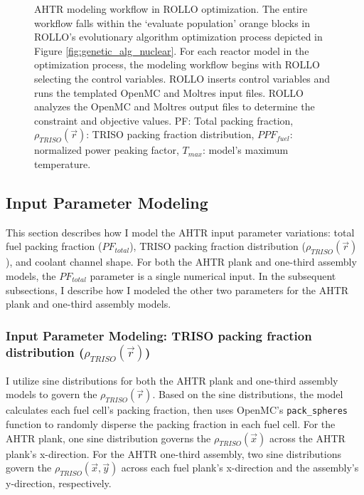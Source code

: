 \begin{figure}[htbp]
    \caption{\acrfull{AHTR} modeling workflow in \acrfull{ROLLO} optimization. The entire 
    workflow falls within the `evaluate population' orange blocks in ROLLO's evolutionary 
    algorithm optimization process depicted in Figure \ref{fig:genetic_alg_nuclear}. 
    For each reactor model in the optimization process, the modeling workflow begins 
    with ROLLO selecting the control variables. 
    ROLLO inserts control variables and runs the templated OpenMC and Moltres 
    input files. 
    ROLLO analyzes the OpenMC and Moltres output files to determine the constraint and 
    objective values.
    PF: Total packing fraction, $\rho_{TRISO}(\vec{r})$: TRISO packing fraction 
    distribution, $PPF_{fuel}$: normalized power peaking factor, $T_{max}$: model's maximum 
    temperature.} 
    \label{fig:ahtr-model-flow}
\end{figure}

\subsection{Input Parameter Modeling}
\label{sec:input-parameter-modeling}
This section describes how I model the \gls{AHTR} input parameter variations: 
total fuel packing fraction ($PF_{total}$), \gls{TRISO} packing fraction distribution
($\rho_{TRISO}(\vec{r})$), and coolant channel shape. 
For both the \gls{AHTR} plank and one-third assembly models, the $PF_{total}$ parameter 
is a single numerical input.
In the subsequent subsections, I describe how I modeled the other two parameters for 
the \gls{AHTR} plank and one-third assembly models. 

\subsubsection{Input Parameter Modeling: TRISO packing fraction distribution 
($\rho_{TRISO}(\vec{r})$)}
I utilize sine distributions for both the \gls{AHTR} plank and one-third assembly 
models to govern the $\rho_{TRISO}(\vec{r})$.
Based on the sine distributions, the model calculates each fuel cell's packing 
fraction, then uses OpenMC's \texttt{pack\_spheres} function to randomly disperse 
the packing fraction in each fuel cell. 
For the \gls{AHTR} plank, one sine distribution governs the $\rho_{TRISO}(\vec{x})$ 
across the \gls{AHTR} plank's x-direction. 
For the \gls{AHTR} one-third assembly, two sine distributions govern the 
$\rho_{TRISO}(\vec{x}, \vec{y})$ across each fuel plank's x-direction and the 
assembly's y-direction, respectively. 

